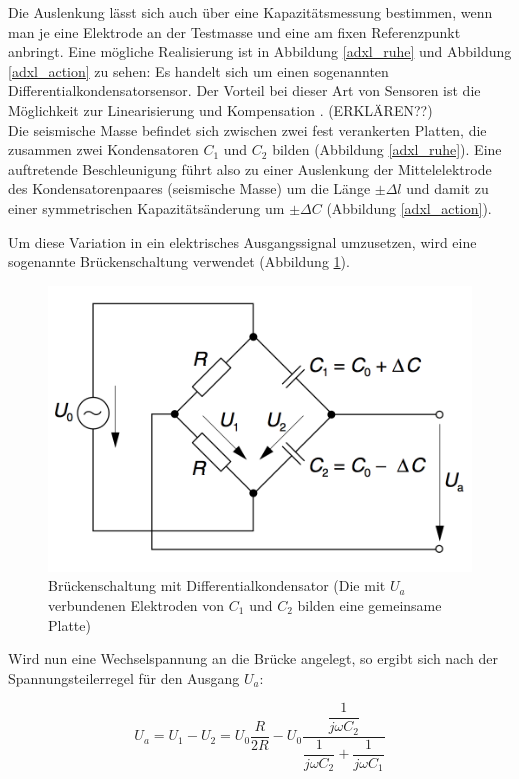 \documentclass[12pt,a4paper]{scrartcl}
\begin{document}
Die Auslenkung lässt sich auch über eine Kapazitätsmessung bestimmen, wenn man je eine Elektrode an der Testmasse und eine am fixen Referenzpunkt anbringt.\citep{S.J.-Sherman:1992ul} Eine mögliche Realisierung ist in Abbildung \ref{adxl_ruhe} und Abbildung \ref{adxl_action} zu sehen: Es handelt sich um einen sogenannten Differentialkondensatorsensor. Der Vorteil bei dieser Art von Sensoren ist die Möglichkeit zur Linearisierung und Kompensation \citep{:2002fk}. (ERKLÄREN??) \\
Die seismische Masse befindet sich zwischen zwei fest verankerten Platten, die zusammen zwei Kondensatoren $C_1$ und $C_2$ bilden (Abbildung \ref{adxl_ruhe}). Eine auftretende Beschleunigung führt also zu einer Auslenkung der Mittelelektrode des Kondensatorenpaares (seismische Masse) um die Länge $\pm \Delta l$ und damit zu einer symmetrischen Kapazitätsänderung um $\pm \Delta C$ (Abbildung \ref{adxl_action}).

Um diese Variation in ein elektrisches Ausgangssignal umzusetzen, wird eine sogenannte Brückenschaltung verwendet (Abbildung \ref{bruecke}).

\begin{figure}[H]
\centering
\includegraphics[scale=2]{schaltung_beschleunigungssensor.png}
\caption{Brückenschaltung mit Differentialkondensator (Die mit $U_a$ verbundenen Elektroden von $C_1$ und $C_2$ bilden eine gemeinsame Platte) \citep{:2002fk}}
\label{bruecke}
\end{figure}

Wird nun eine Wechselspannung an die Brücke angelegt, so ergibt sich nach der Spannungsteilerregel für den Ausgang $U_a$:

\begin{equation}
U_a = U_1 - U_2 = U_0 \frac{R}{2 R} - U_0 \dfrac{\dfrac{1}{j \omega C_2} } { \dfrac{1} {j \omega C_2} + \dfrac{1}{j \omega C_1} }
\end{equation}
\end{document}
